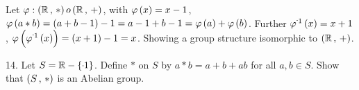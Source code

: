 \begin{mdframed}[style=darkAnswer,frametitle={Joe Starr}]
  Let $\varphi:\left(\mathbb{R}\,,\,\ast\right)  o\left(\mathbb{R}\,,\,+\right)$, with $\varphi\left(x\right)=x-1$,
  $\varphi\left(a\ast b\right)= \left(a+b-1\right)-1=a-1+b-1=\varphi\left(a\right)+\varphi\left(b\right)$. Further
  $\inv{\varphi}\lrp{x}=x+1$, $\pof{\inv{\varphi}\lrp{x}}=\lrp{x+1}-1=x$.
  Showing a group structure isomorphic to $\left(\mathbb{R}\,,\,+\right)$.
\end{mdframed}
\newpage
\begin{mdframed}[style=darkQuesion]
  14. Let $S= \R - \lrs{\m1}$. Define $\ast$ on $S$ by $a\ast b=a+b+ab$ for all
  $a,b \in S$. Show that $\left(S\,,\,\ast\right)$ is an Abelian group.
\end{mdframed}

